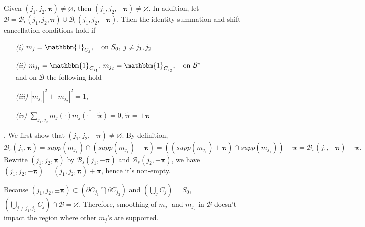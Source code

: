 \begin{prop}\label{prop: pair-smooth}
Given $(j_1,j_2,\boldsymbol{\pi})\neq \varnothing$, %
then $(j_1,j_2,-\boldsymbol{\pi})\neq\varnothing$. In addition, let $\mathcal{B}=\mathcal{B}_{\epsilon}(j_1,j_2,\boldsymbol{\pi})\cup\mathcal{B}_{\epsilon}(j_1,j_2,-\boldsymbol{\pi})$. Then the identity summation and shift cancellation conditions hold if
\begin{itemize}
\item[{\it (i)}] $m_j = \mathbbm{1}_{C_j},\quad\text{on }S_0,\; j\neq j_1,j_2$
\item[{\it (ii)}] $m_{j_1} =\mathbbm{1}_{C_{j_1}},\, m_{j_2} =\mathbbm{1}_{C_{j_2}},\quad \text{on }\mathcal{B}^c$\\[.5em]
\hspace*{-2em} and on $\mathcal{B}$ the following hold%
\item[{\it(iii)}] $|m_{j_1}|^2 + |m_{j_2}|^2 = 1,$ %
\item[{\it (iv)}] $\sum_{j_1,j_2} m_j(\cdot)\overline{m_j(\cdot+\widetilde{\boldsymbol{\pi}})} = 0,\, \widetilde{\boldsymbol{\pi}} = \pm\boldsymbol{\pi}$
\end{itemize}
\end{prop}
.
 We first show that $(j_1,j_2,-\boldsymbol{\pi})\neq\varnothing.$ By definition, $\mathcal{B}_s(j_1,\boldsymbol{\pi}) = supp(m_{j_1})\cap (supp(m_{j_1})-\boldsymbol{\pi}) = \left((supp(m_{j_1})+\boldsymbol{\pi})\cap supp(m_{j_1})\right)-\boldsymbol{\pi} = \mathcal{B}_s(j_1,-\boldsymbol{\pi})-\boldsymbol{\pi}.$ Rewrite $(j_1,j_2,\boldsymbol{\pi})$ by $\mathcal{B}_s(j_1,-\boldsymbol{\pi})$ and $\mathcal{B}_s(j_2,-\boldsymbol{\pi})$, we have $(j_1,j_2,-\boldsymbol{\pi}) = (j_1,j_2,\boldsymbol{\pi})+\boldsymbol{\pi}$, hence it's non-empty.
 
Because $(j_1,j_2,\pm\boldsymbol{\pi})\subset (\partial C_{j_1} \bigcap \partial C_{j_2})$ and $(\bigcup_{j}C_j)=S_0$, $(\bigcup_{j\neq j_1,j_2}C_j)\cap \mathcal{B} = \varnothing.$ Therefore, smoothing of $m_{j_1}$ and $m_{j_2}$ in $\mathcal{B}$ doesn't impact the region where other $m_j$'s are supported.

